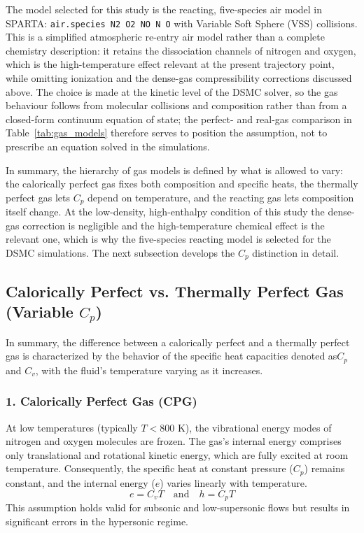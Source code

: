 \noindent The model selected for this study is the reacting, five-species air model in SPARTA: \texttt{air.species N2 O2 NO N O} with Variable Soft Sphere (VSS) collisions. This is a simplified atmospheric re-entry air model rather than a complete chemistry description: it retains the dissociation channels of nitrogen and oxygen, which is the high-temperature effect relevant at the present trajectory point, while omitting ionization and the dense-gas compressibility corrections discussed above. The choice is made at the kinetic level of the DSMC solver, so the gas behaviour follows from molecular collisions and composition rather than from a closed-form continuum equation of state; the perfect- and real-gas comparison in Table~\ref{tab:gas_models} therefore serves to position the assumption, not to prescribe an equation solved in the simulations.

In summary, the hierarchy of gas models is defined by what is allowed to vary: the calorically perfect gas fixes both composition and specific heats, the thermally perfect gas lets $C_p$ depend on temperature, and the reacting gas lets composition itself change. At the low-density, high-enthalpy condition of this study the dense-gas correction is negligible and the high-temperature chemical effect is the relevant one, which is why the five-species reacting model is selected for the DSMC simulations. The next subsection develops the $C_p$ distinction in detail.

\subsection{Calorically Perfect vs. Thermally Perfect Gas (Variable \texorpdfstring{$C_p$}{C-p})}

\par
In summary, the difference between a calorically perfect and a thermally perfect gas is characterized by the behavior of the specific heat capacities denoted as$C_p$ and $C_v$, with the fluid's temperature varying as it increases.

\subsubsection*{1. Calorically Perfect Gas (CPG)}
At low temperatures (typically $T < 800$ K), the vibrational energy modes of nitrogen and oxygen molecules are frozen. The gas's internal energy comprises only translational and rotational kinetic energy, which are fully excited at room temperature. Consequently, the specific heat at constant pressure ($C_p$) remains constant, and the internal energy ($e$) varies linearly with temperature.
\begin{equation}
    e = C_v T \quad \text{and} \quad h = C_p T
\end{equation}
This assumption holds valid for subsonic and low-supersonic flows but results in significant errors in the hypersonic regime.
\par
